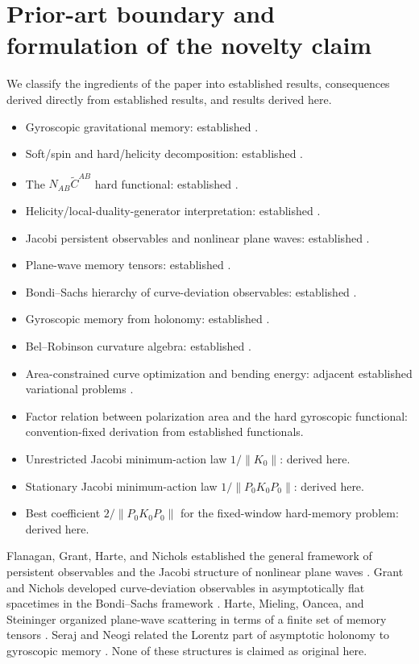 \section{Prior-art boundary and formulation of the novelty claim}
We classify the ingredients of the paper into established results, consequences derived directly from established results, and results derived here.
\begin{itemize}
\item Gyroscopic gravitational memory: established \cite{SerajOblak2023}.
\item Soft/spin and hard/helicity decomposition: established \cite{SerajOblak2023,FayeSeraj2025}.
\item The $N_{AB}\widetilde C^{AB}$ hard functional: established \cite{SerajOblak2023,FayeSeraj2025}.
\item Helicity/local-duality-generator interpretation: established \cite{SerajOblak2023}.
\item Jacobi persistent observables and nonlinear plane waves: established \cite{Flanagan2019,Flanagan2020}.
\item Plane-wave memory tensors: established \cite{Harte2025}.
\item Bondi--Sachs hierarchy of curve-deviation observables: established \cite{GrantNichols2022}.
\item Gyroscopic memory from holonomy: established \cite{SerajNeogi2023}.
\item Bel--Robinson curvature algebra: established \cite{FerrandoSaez2012}.
\item Area-constrained curve optimization and bending energy: adjacent established variational problems \cite{Hahmann2005,Ferone2016}.
\item Factor relation between polarization area and the hard gyroscopic functional: convention-fixed derivation from established functionals.
\item Unrestricted Jacobi minimum-action law $1/\|K_0\|$: derived here.
\item Stationary Jacobi minimum-action law $1/\|P_0K_0P_0\|$: derived here.
\item Best coefficient $2/\|P_0K_0P_0\|$ for the fixed-window hard-memory problem: derived here.
\end{itemize}

Flanagan, Grant, Harte, and Nichols established the general framework of persistent observables and the Jacobi structure of nonlinear plane waves \cite{Flanagan2019,Flanagan2020}. Grant and Nichols developed curve-deviation observables in asymptotically flat spacetimes in the Bondi--Sachs framework \cite{GrantNichols2022}. Harte, Mieling, Oancea, and Steininger organized plane-wave scattering in terms of a finite set of memory tensors \cite{Harte2025}. Seraj and Neogi related the Lorentz part of asymptotic holonomy to gyroscopic memory \cite{SerajNeogi2023}. None of these structures is claimed as original here.

